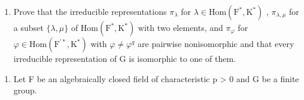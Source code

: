 \begin{enumerate}
\def\labelenumi{\alph{enumi})}
\setcounter{enumi}{4}
\tightlist
\item
  Prove that the irreducible representations \(\pi_{\lambda}\) for \(\lambda\in\mathrm{Hom}(\mathrm{F}^{*},\mathrm{K}^{*})\) , \(\pi_{\lambda,\mu}\) for a subset \(\{\lambda,\mu\}\) of \(\mathrm{Hom}(\mathrm{F}^{*},\mathrm{K}^{*})\) with two elements, and \(\pi_{\varphi}\) for \(\varphi\in\mathrm{Hom}(\mathrm{F}^{\prime*},\mathrm{K}^{*})\) with \(\varphi\neq\varphi^{q}\) are pairwise nonisomorphic and that every irreducible representation of G is isomorphic to one of them.
\end{enumerate}

\begin{enumerate}
\def\labelenumi{\arabic{enumi})}
\setcounter{enumi}{26}
\tightlist
\item
  Let F be an algebraically closed field of characteristic p \textgreater{} 0 and G be a finite group.
\end{enumerate}

